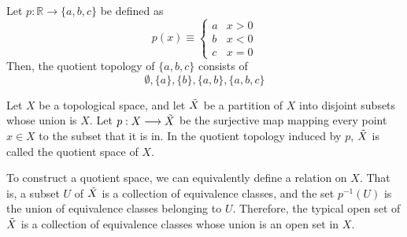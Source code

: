     \begin{example}
    Let $p: \mathbb{R} \longrightarrow \{a, b, c\}$ be defined as 
    \[p(x) \equiv \begin{cases}
          a & x > 0 \\
          b & x < 0 \\
          c & x = 0
    \end{cases}\]
    Then, the quotient topology of $\{a, b, c\}$ consists of 
    \[\emptyset, \{a\}, \{b\}, \{a, b\}, \{a, b, c\}\]
    \end{example}

    \begin{definition}
    Let $X$ be a topological space, and let $\Tilde{X}$ be a partition of $X$ into disjoint subsets whose union is $X$. Let $p: X \longrightarrow \Tilde{X}$ be the surjective map mapping every point $x \in X$ to the subset that it is in. In the quotient topology induced by $p$, $\Tilde{X}$ is called the quotient space of $X$. 
    \end{definition}

    To construct a quotient space, we can equivalently define a relation on $X$. That is, a subset $U$ of $\Tilde{X}$ is a collection of equivalence classes, and the set $p^{-1}(U)$ is the union of equivalence classes belonging to $U$. Therefore, the typical open set of $\Tilde{X}$ is a collection of equivalence classes whose union is an open set in $X$. 

